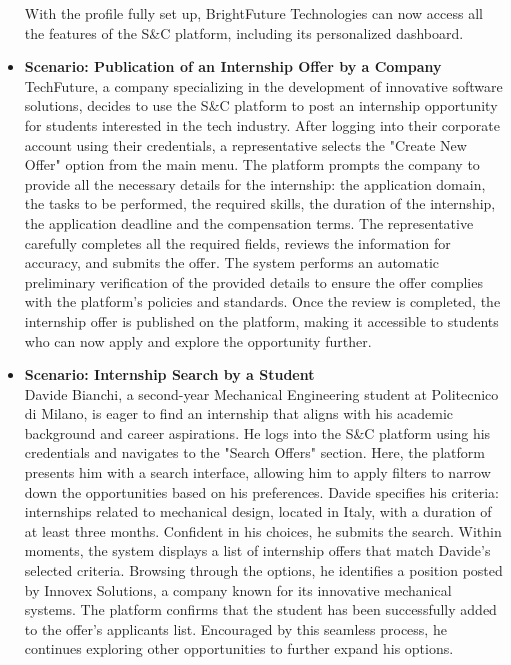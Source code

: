 \begin{itemize}
        With the profile fully set up, BrightFuture Technologies can now access all the features of the S\&C platform, including its personalized dashboard.
        \incscenario
    \item \textbf{\nth{\thescenario} Scenario: Publication of an Internship Offer by a Company}
    \\
        TechFuture, a company specializing in the development of innovative software solutions, decides to use the S\&C platform to post an internship opportunity for students interested in the tech industry. After logging into their corporate account using their credentials, a representative selects the "Create New Offer" option from the main menu.
        The platform prompts the company to provide all the necessary details for the internship: the application domain, the tasks to be performed, the required skills, the duration of the internship, the application deadline and the compensation terms. The representative carefully completes all the required fields, reviews the information for accuracy, and submits the offer.
        The system performs an automatic preliminary verification of the provided details to ensure the offer complies with the platform’s policies and standards. Once the review is completed, the internship offer is published on the platform, making it accessible to students who can now apply and explore the opportunity further.
        \incscenario
    \item \textbf{\nth{\thescenario} Scenario: Internship Search by a Student}
    \\
        Davide Bianchi, a second-year Mechanical Engineering student at Politecnico di Milano, is eager to find an internship that aligns with his academic background and career aspirations. He logs into the S\&C platform using his credentials and navigates to the "Search Offers" section.
        Here, the platform presents him with a search interface, allowing him to apply filters to narrow down the opportunities based on his preferences. Davide specifies his criteria: internships related to mechanical design, located in Italy, with a duration of at least three months. Confident in his choices, he submits the search.
        Within moments, the system displays a list of internship offers that match Davide's selected criteria. Browsing through the options, he identifies a position posted by Innovex Solutions, a company known for its innovative mechanical systems.
        The platform confirms that the student has been successfully added to the offer's applicants list. Encouraged by this seamless process, he continues exploring other opportunities to further expand his options.

\end{itemize}
